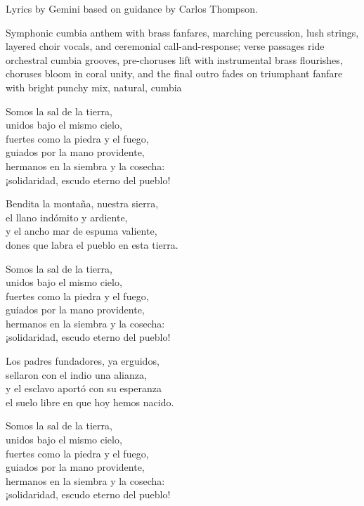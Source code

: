 
\begin{notes}
Lyrics by Gemini based on guidance by Carlos Thompson.
\end{notes}
\begin{style}
Symphonic cumbia anthem with brass fanfares, marching percussion, lush strings, layered choir vocals, and ceremonial call-and-response; verse passages ride orchestral cumbia grooves, pre-choruses lift with instrumental brass flourishes, choruses bloom in coral unity, and the final outro fades on triumphant fanfare with bright punchy mix, natural, cumbia
\end{style}
\begin{lyrics}
Somos la sal de la tierra,\\
unidos bajo el mismo cielo,\\
fuertes como la piedra y el fuego,\\
guiados por la mano providente,\\
hermanos en la siembra y la cosecha:\\
¡solidaridad, escudo eterno del pueblo!

Bendita la montaña, nuestra sierra,\\
el llano indómito y ardiente,\\
y el ancho mar de espuma valiente,\\
dones que labra el pueblo en esta tierra.

Somos la sal de la tierra,\\
unidos bajo el mismo cielo,\\
fuertes como la piedra y el fuego,\\
guiados por la mano providente,\\
hermanos en la siembra y la cosecha:\\
¡solidaridad, escudo eterno del pueblo!

Los padres fundadores, ya erguidos,\\
sellaron con el indio una alianza,\\
y el esclavo aportó con su esperanza\\
el suelo libre en que hoy hemos nacido.

Somos la sal de la tierra,\\
unidos bajo el mismo cielo,\\
fuertes como la piedra y el fuego,\\
guiados por la mano providente,\\
hermanos en la siembra y la cosecha:\\
¡solidaridad, escudo eterno del pueblo!


\end{lyrics}

